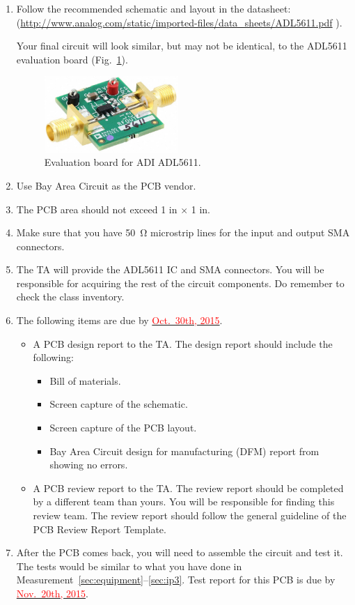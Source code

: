 \documentclass[letterpaper, 11pt]{article}
\newcommand{\due}[1]{\href{https://github.com/ucdart/UCD-EEC134/blob/master/support/schedule/eec134-schedule.pdf}{\textcolor{red}{#1}}}
\begin{document}
\begin{enumerate}
	\item Follow the recommended schematic and layout in the datasheet:\\ (\url{http://www.analog.com/static/imported-files/data_sheets/ADL5611.pdf} ).
	
	 Your final circuit will look similar, but may not be identical, to the ADL5611 evaluation board (Fig.~\ref{fig:adl5611-evalz}).
 
		\begin{figure}[h]
			\centering
			\includegraphics[width=2in]{adl5611-evalz}
			\caption{Evaluation board for ADI ADL5611.}
			\label{fig:adl5611-evalz}
		\end{figure}
	\item Use Bay Area Circuit as the PCB vendor.
	
	\item The PCB area should not exceed 1 in $\times$ 1 in.
	 
	\item Make sure that you have \SI{50}{\ohm} microstrip lines for the input and output SMA connectors.
	
	\item The TA will provide the ADL5611 IC and SMA connectors. You will be responsible for acquiring the rest of the circuit components. Do remember to check the class inventory. 
	
	\item The following items are due by \due{Oct.~30th, 2015}. 
		\begin{itemize}
			\item A PCB design report to the TA. The design report should include the following:
				\begin{itemize}
					\item Bill of materials.
					\item Screen capture of the schematic.
					\item Screen capture of the PCB layout.
					\item Bay Area Circuit design for manufacturing (DFM) report from showing no errors.
				\end{itemize}
			\item A PCB review report to the TA. The review report should be completed by a different team than yours. You will be responsible for finding this review team. The review report should follow the general guideline of the PCB Review Report Template.
		\end{itemize}

	\item After the PCB comes back, you will need to assemble the circuit and test it. The tests would be similar to what you have done in Measurement~\ref{sec:equipment}--\ref{sec:ip3}. Test report for this PCB is due by \due{Nov.~20th, 2015}.

\end{enumerate}
	
\end{document}
